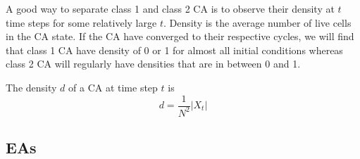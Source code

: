 A good way to separate class 1 and class 2 CA is to observe their density at $t$ time steps for some relatively large $t$. Density is the average number of live cells in the CA state. If the CA have converged to their respective cycles, we will find that class 1 CA have density of 0 or 1 for almost all initial conditions whereas class 2 CA will regularly have densities that are in between 0 and 1.\\

\begin{definition}[Density]
The density $d$ of a CA at time step $t$ is
\begin{equation}
    d = \frac{1}{N^2} \left| X_{t} \right|
\end{equation}
\end{definition}


    


\subsection{EAs}

